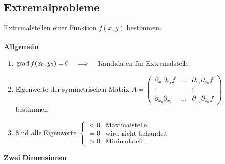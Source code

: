 \subsection{Extremalprobleme}
Extremalstellen einer Funktion $f(x,y)$ bestimmen.\\ \\
\textbf{Allgemein}\
	\begin{enumerate}      
    	\item $ \operatorname{grad} f(x_0,y_0) = 0 \quad \Longrightarrow \quad $ Kandidaten für Extremalstelle
    	\item   Eigenwerte der symmetrischen Matrix $A = \begin{pmatrix}
    			\partial_{x_1} \partial_{x_1} f & \ldots & \partial_{x_1} \partial_{x_n}
    			f\\ \vdots && \vdots\\
    			\partial_{x_n} \partial_{x_1} & \ldots & \partial_{x_n} \partial_{x_n} f
    			\end{pmatrix} $ bestimmen
		\item Sind alle Eigenwerte  $\begin{cases}
                                 		< 0 & \text{Maximalstelle} \\
                                 		= 0 & \text{wird nicht behandelt} \\
                                 		> 0 & \text{Minimalstelle}                                 		
                                    \end{cases}$
	\end{enumerate}
\textbf{Zwei Dimensionen}\\

